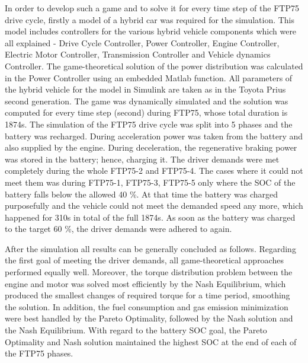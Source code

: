 In order to develop such a game and to solve it for every time step of the FTP75 drive cycle, firstly a model of a hybrid car was required for the simulation. This model includes controllers for the various hybrid vehicle components which were all explained - Drive Cycle Controller, Power Controller, Engine Controller, Electric Motor Controller, Transmission Controller and Vehicle dynamics Controller. The game-theoretical solution of the power distribution was calculated in the Power Controller using an embedded Matlab function. All parameters of the hybrid vehicle for the model in Simulink are taken as in the Toyota Prius second generation. The game was dynamically simulated and the solution was computed for every time step (second) during FTP75, whose total duration is 1874s. The simulation of the FTP75 drive cycle was split into 5 phases and the battery was recharged. During acceleration power was taken from the battery and also supplied by the engine. During deceleration, the regenerative braking power was stored in the battery; hence, charging it. The driver demands were met completely during the whole FTP75-2 and FTP75-4. The cases where it could not meet them was during FTP75-1, FTP75-3, FTP75-5 only where the SOC of the battery falls below the allowed 40 \%. At that time the battery was charged purposefully and the vehicle could not meet the demanded speed any more, which happened for 310s in total of the full 1874s. As soon as the battery was charged to the target 60 \%, the driver demands were adhered to again.

After the simulation all results can be generally concluded as follows. Regarding the first goal of meeting the driver demands, all game-theoretical approaches performed equally well. Moreover, the torque distribution problem between the engine and motor was solved most efficiently by the Nash Equilibrium, which produced the smallest changes of required torque for a time period, smoothing the solution. In addition, the fuel consumption and gas emission minimization were best handled by the Pareto Optimality, followed by the Nash solution and the Nash Equilibrium. With regard to the battery SOC goal, the Pareto Optimality and Nash solution maintained the highest SOC at the end of each of the FTP75 phases.

